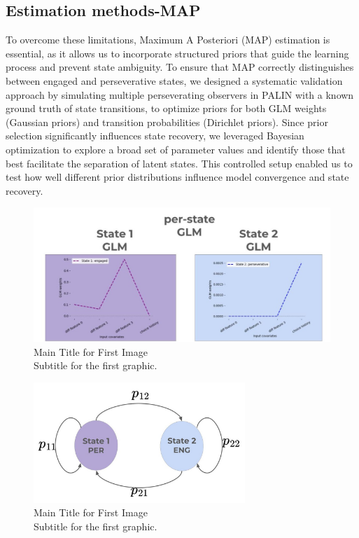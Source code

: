\subsection {Estimation methods-MAP} 
To overcome these limitations, Maximum A Posteriori (MAP) estimation is essential, as it allows us to incorporate structured priors that guide the learning process and prevent state ambiguity. To ensure that MAP correctly distinguishes between engaged and perseverative states, we designed a systematic validation approach by simulating multiple perseverating observers in PALIN with a known ground truth of state transitions, to optimize priors for both GLM weights (Gaussian priors) and transition probabilities (Dirichlet priors). Since prior selection significantly influences state recovery, we leveraged Bayesian optimization to explore a broad set of parameter values and identify those that best facilitate the separation of latent states. This controlled setup enabled us to test how well different prior distributions influence model convergence and state recovery.


\begin{figure}[H]
    \centering
    \includegraphics[width=15cm]{MainLayout/Images/chapter7/glm_perstate.jpg}
    \caption{Main Title for First Image \\ \small Subtitle for the first graphic.}
    \label{fig:patient_responses}
\end{figure}
\begin{figure}[H]
    \centering
    \includegraphics[width=8cm]{MainLayout/Images/chapter7/transition.jpg}
    \caption{Main Title for First Image \\ \small Subtitle for the first graphic.}
    \label{fig:patient_responses}
\end{figure}

